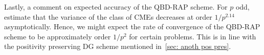 {Lastly, a comment on expected accuracy of the QBD-RAP scheme.} For \(p\) odd, \cite{hht2020} estimate that the variance of the class of CMEs decreases at order \(1/p^{2.14}\) asymptotically. Hence, we might expect the rate of convergence of the QBD-RAP scheme to be approximately order \(1/p^2\) for certain problems. This is in line with the positivity preserving DG scheme mentioned in~\ref{sec: anoth pos pres}. %



